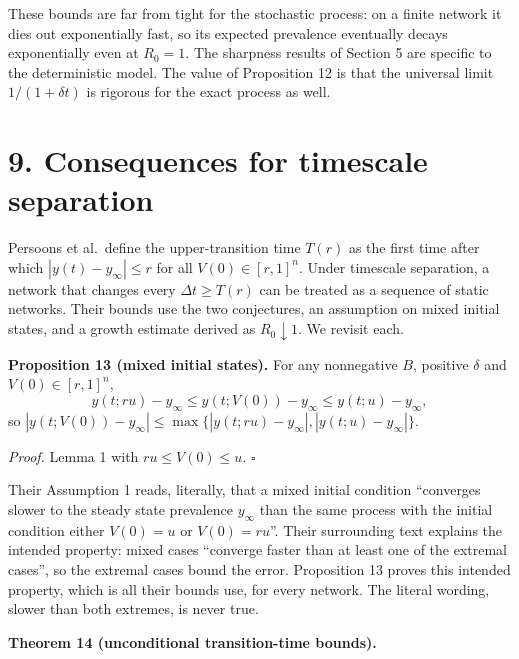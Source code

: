 \documentclass[
  11pt,
  a4paper,
]{article}
\begin{document}
These bounds are far from tight for the stochastic process: on a finite
network it dies out exponentially fast, so its expected prevalence
eventually decays exponentially even at \(R_0=1\). The sharpness results
of Section 5 are specific to the deterministic model. The value of
Proposition 12 is that the universal limit \(1/(1+\delta t)\) is
rigorous for the exact process as well.

\section{9. Consequences for timescale
separation}\label{consequences-for-timescale-separation}

Persoons et al.~define the upper-transition time \(T(r)\) as the first
time after which \(|y(t)-y_\infty|\le r\) for all \(V(0)\in[r,1]^n\).
Under timescale separation, a network that changes every
\(\Delta t\ge T(r)\) can be treated as a sequence of static networks.
Their bounds use the two conjectures, an assumption on mixed initial
states, and a growth estimate derived as \(R_0\downarrow1\). We revisit
each.

\textbf{Proposition 13 (mixed initial states).} For any nonnegative
\(B\), positive \(\delta\) and \(V(0)\in[r,1]^n\),
\[y(t;ru)-y_\infty\le y(t;V(0))-y_\infty\le y(t;u)-y_\infty,\] so
\(|y(t;V(0))-y_\infty|\le\max\{|y(t;ru)-y_\infty|,|y(t;u)-y_\infty|\}\).

\emph{Proof.} Lemma 1 with \(ru\le V(0)\le u\). \(\square\)

Their Assumption 1 reads, literally, that a mixed initial condition
``converges slower to the steady state prevalence \(y_\infty\) than the
same process with the initial condition either \(V(0)=u\) or
\(V(0)=ru\)''. Their surrounding text explains the intended property:
mixed cases ``converge faster than at least one of the extremal cases'',
so the extremal cases bound the error. Proposition 13 proves this
intended property, which is all their bounds use, for every network. The
literal wording, slower than both extremes, is never true.

\textbf{Theorem 14 (unconditional transition-time bounds).}
\end{document}
